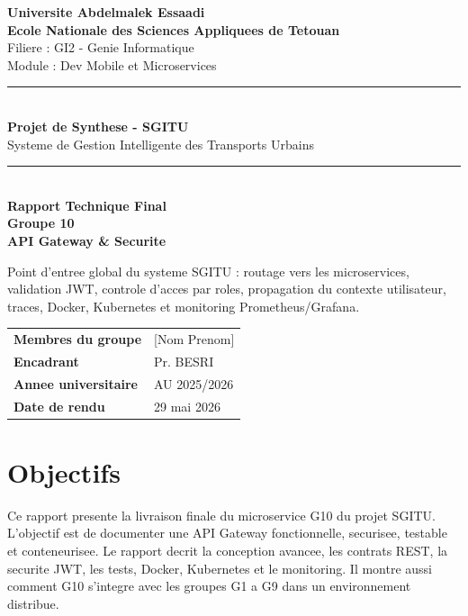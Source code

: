 \documentclass[12pt,a4paper]{article}
\begin{document}
\begin{titlepage}
\begin{center}
\vspace*{0.7cm}
{\Large\bfseries Universite Abdelmalek Essaadi}\\[0.2cm]
{\Large\bfseries Ecole Nationale des Sciences Appliquees de Tetouan}\\[0.3cm]
{\large Filiere : GI2 - Genie Informatique}\\[0.2cm]
{\large Module : Dev Mobile et Microservices}\\[1cm]

\rule{\linewidth}{1pt}\\[0.5cm]
{\Large\bfseries Projet de Synthese - SGITU}\\[0.2cm]
{\large Systeme de Gestion Intelligente des Transports Urbains}\\[0.5cm]
\rule{\linewidth}{1pt}\\[1.2cm]

{\Huge\bfseries Rapport Technique Final}\\[0.7cm]
{\LARGE\bfseries Groupe 10}\\[0.3cm]
{\LARGE\bfseries API Gateway \& Securite}\\[0.8cm]

\begin{infoBox}
\centering
Point d'entree global du systeme SGITU : routage vers les microservices, validation JWT, controle d'acces par roles, propagation du contexte utilisateur, traces, Docker, Kubernetes et monitoring Prometheus/Grafana.
\end{infoBox}

\vfill
\begin{tabular}{>{\bfseries}p{5cm}p{8cm}}
Membres du groupe & [Nom Prenom]    \\
Encadrant & Pr. BESRI \\
Annee universitaire & AU 2025/2026 \\
Date de rendu & 29 mai 2026 \\
\end{tabular}
\end{center}
\end{titlepage}

\section*{Objectifs}
Ce rapport presente la livraison finale du microservice G10 du projet SGITU. L'objectif est de documenter une API Gateway fonctionnelle, securisee, testable et conteneurisee. Le rapport decrit la conception avancee, les contrats REST, la securite JWT, les tests, Docker, Kubernetes et le monitoring. Il montre aussi comment G10 s'integre avec les groupes G1 a G9 dans un environnement distribue.
\end{document}

